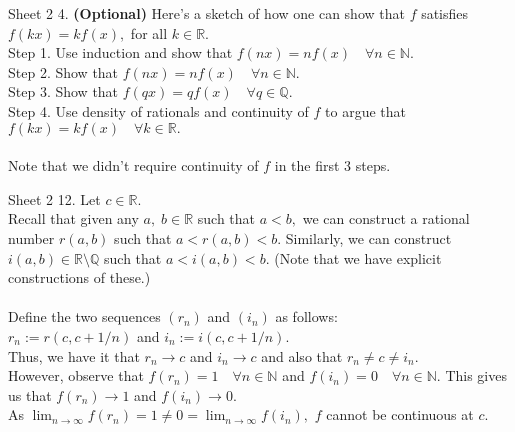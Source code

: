 \documentclass[handout, aspectratio=169]{beamer}
\begin{document}
\begin{frame}{Sheet 2}
	4. \textbf{(Optional)} Here's a sketch of how one can show that $f$ satisfies $f(kx) = kf(x),$ for all $k \in \mathbb{R}.$\\
	Step 1. Use induction and show that $f(nx) = nf(x) \quad \forall n \in \mathbb{N}.$\\
	Step 2. Show that $f(nx) = nf(x) \quad \forall n \in \mathbb{N}.$\\
	Step 3. Show that $f(qx) = qf(x) \quad \forall q \in \mathbb{Q}.$\\
	Step 4. Use density of rationals and continuity of $f$ to argue that $f(kx) = kf(x) \quad \forall k \in \mathbb{R}.$\\~\\
	Note that we didn't require continuity of $f$ in the first 3 steps.
\end{frame}
\begin{frame}{Sheet 2}
	12. Let $c \in \mathbb{R}.$\\
	Recall that given any $a,\;b\in\mathbb{R}$ such that $a < b,$ we can construct a rational number $r(a, b)$ such that $a < r(a, b) < b.$ Similarly, we can construct $i(a, b) \in \mathbb{R}\setminus\mathbb{Q}$ such that $a < i(a, b) < b.$ (Note that we have explicit constructions of these.)\\~\\
	Define the two sequences $(r_n)$ and $(i_n)$ as follows:\\
	$r_n := r(c, c+1/n)$ and $i_n := i(c, c + 1/n).$\\
	Thus, we have it that $r_n \to c$ and $i_n \to c$ and also that $r_n \neq c \neq i_n.$\\
	However, observe that $f(r_n) = 1 \quad \forall n \in \mathbb{N}$ and $f(i_n) = 0 \quad \forall n \in \mathbb{N}.$ This gives us that $f(r_n) \to 1$ and $f(i_n) \to 0.$\\
	As $\displaystyle\lim_{n\to \infty}f(r_n) = 1 \neq 0 = \lim_{n\to \infty}f(i_n),$ $f$ cannot be continuous at $c.$ 
\end{frame}
\end{document}
